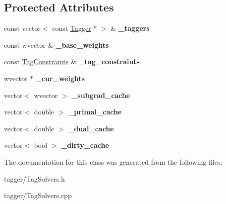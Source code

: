 \subsection*{Protected Attributes}
\begin{DoxyCompactItemize}
\item 
\hypertarget{classTaggerDual_a0068b276abb09b34ab08e9cc14947ee3}{
const vector$<$ const \hyperlink{classTagger}{Tagger} $\ast$ $>$ \& {\bfseries \_\-taggers}}
\label{classTaggerDual_a0068b276abb09b34ab08e9cc14947ee3}

\item 
\hypertarget{classTaggerDual_a0073fa0f694790d365ca959ed8386e26}{
const wvector \& {\bfseries \_\-base\_\-weights}}
\label{classTaggerDual_a0073fa0f694790d365ca959ed8386e26}

\item 
\hypertarget{classTaggerDual_ab8845276b234c329c967529091f51e8f}{
const \hyperlink{classTagConstraints}{TagConstraints} \& {\bfseries \_\-tag\_\-constraints}}
\label{classTaggerDual_ab8845276b234c329c967529091f51e8f}

\item 
\hypertarget{classTaggerDual_a9974a79ebf2547f3e80e9d68d06b49be}{
wvector $\ast$ {\bfseries \_\-cur\_\-weights}}
\label{classTaggerDual_a9974a79ebf2547f3e80e9d68d06b49be}

\item 
\hypertarget{classTaggerDual_a57232f5a7702b7715f8517d408086dbe}{
vector$<$ wvector $>$ {\bfseries \_\-subgrad\_\-cache}}
\label{classTaggerDual_a57232f5a7702b7715f8517d408086dbe}

\item 
\hypertarget{classTaggerDual_a47cdc599b2c73836f33aa443053e3534}{
vector$<$ double $>$ {\bfseries \_\-primal\_\-cache}}
\label{classTaggerDual_a47cdc599b2c73836f33aa443053e3534}

\item 
\hypertarget{classTaggerDual_a4472c903ae391e7cc4912bc473a9eae2}{
vector$<$ double $>$ {\bfseries \_\-dual\_\-cache}}
\label{classTaggerDual_a4472c903ae391e7cc4912bc473a9eae2}

\item 
\hypertarget{classTaggerDual_a259d5ef5c5020c75a68527950ff41310}{
vector$<$ bool $>$ {\bfseries \_\-dirty\_\-cache}}
\label{classTaggerDual_a259d5ef5c5020c75a68527950ff41310}

\end{DoxyCompactItemize}


The documentation for this class was generated from the following files:\begin{DoxyCompactItemize}
\item 
tagger/TagSolvers.h\item 
tagger/TagSolvers.cpp\end{DoxyCompactItemize}
